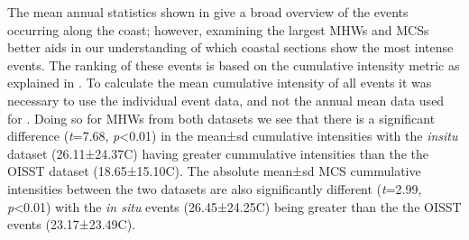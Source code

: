 \documentclass[a4paper,10pt,review]{elsarticle}
\begin{document}
The mean annual statistics shown in  give a broad overview of the events occurring along the coast; however, examining the largest MHWs and MCSs better aids in our understanding of which coastal sections show the most intense events. The ranking of these events is based on the cumulative intensity metric as explained in . To calculate the mean cumulative intensity of all events it was necessary to use the individual event data, and not the annual mean data used for . Doing so for MHWs from both datasets we see that there is a significant difference (\emph{t}=7.68, \emph{p}<0.01) in the mean±sd cumulative intensities with the \emph{insitu} dataset (26.11±24.37\degree C) having greater cummulative intensities than the the OISST dataset (18.65±15.10\degree C). The absolute mean±sd MCS cummulative intensities between the two datasets are also significantly different (\emph{t}=2.99, \emph{p}<0.01) with the \emph{in situ} events (26.45±24.25\degree C) being greater than the the OISST events (23.17±23.49\degree C).
\end{document}
